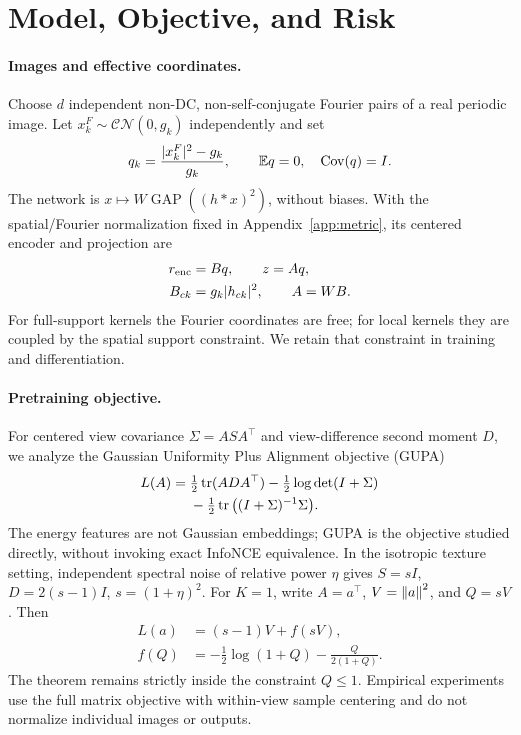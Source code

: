 \section{Model, Objective, and Risk}
\label{sec:setup}
\paragraph{Images and effective coordinates.}
Choose $d$ independent non-DC, non-self-conjugate Fourier pairs of a real periodic image. Let $x_k^F\sim\mathcal{CN}(0,g_k)$ independently and set
\begin{equation}
q_k=\frac{|x_k^F|^2-g_k}{g_k},\qquad \mathbb E q=0,\quad \operatorname{Cov}(q)=I.
\end{equation}
The network is $x\mapsto W\operatorname{GAP}((h*x)^2)$, without biases. With the spatial/Fourier normalization fixed in Appendix~\ref{app:metric}, its centered encoder and projection are
\begin{align}
r_{\rm enc}&=Bq,\qquad z=Aq,\nonumber\\
B_{ck}&=g_k|h_{ck}|^2,\qquad A=WB.
\label{eq:effective}
\end{align}
For full-support kernels the Fourier coordinates are free; for local kernels they are coupled by the spatial support constraint. We retain that constraint in training and differentiation.

\paragraph{Pretraining objective.}
For centered view covariance $\Sigma=ASA^\top$ and view-difference second moment $D$, we analyze the Gaussian Uniformity Plus Alignment objective (GUPA)~\cite{torralba2026theory}
\begin{align}
L(A)={}&\tfrac12\operatorname{tr}(ADA^\top)-\tfrac12\log\det(I+\Sigma)\nonumber\\
&-\tfrac12\operatorname{tr}\big((I+\Sigma)^{-1}\Sigma\big).
\label{eq:gupa}
\end{align}
The energy features are not Gaussian embeddings; GUPA is the objective studied directly, without invoking exact InfoNCE equivalence. In the isotropic texture setting, independent spectral noise of relative power $\eta$ gives $S=sI$, $D=2(s-1)I$, $s=(1+\eta)^2$. For $K=1$, write $A=a^\top$, $V=\left\lVert a\right\rVert^2$, and $Q=sV$. Then
\begin{align}
L(a)&=(s-1)V+f(sV),\\
f(Q)&=-\tfrac12\log(1+Q)-\frac{Q}{2(1+Q)}.
\end{align}
The theorem remains strictly inside the constraint $Q\leq1$. Empirical experiments use the full matrix objective with within-view sample centering and do not normalize individual images or outputs.

